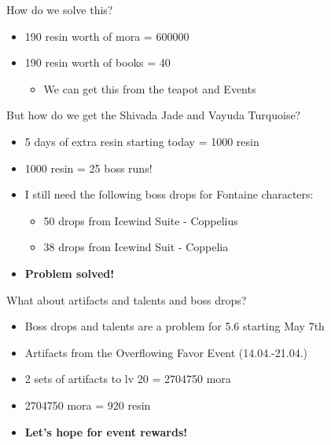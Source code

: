\documentclass{beamer}
\begin{document}
\begin{frame}{How do we solve this?}
\begin{itemize}
    \pause 
    \item 190 resin worth of mora = 600000
    \pause 
    \item 190 resin worth of books = 40 
    \pause 
        \begin{itemize}
            \item We can get this from the teapot and Events 
        \end{itemize}
\end{itemize}
\pause 

\end{frame}

\begin{frame}{But how do we get the Shivada Jade and Vayuda Turquoise?}
\begin{itemize}
    \item 5 days of extra resin starting today = 1000 resin 
    \item 1000 resin = 25 boss runs!
    \item I still need the following boss drops for Fontaine characters: 
        \begin{itemize}
            \item 50 drops from Icewind Suite - Coppelius
            \item 38 drops from Icewind Suit - Coppelia
        \end{itemize}
    \item\textbf{Problem solved!}
\end{itemize}
\pause 

\end{frame}

\begin{frame}{What about artifacts and talents and boss drops?}
\begin{itemize}
    \pause
    \item Boss drops and talents are a problem for 5.6 starting May 7th 
    \pause
    \item Artifacts from the Overflowing Favor Event (14.04.-21.04.)
    \pause
    \item 2 sets of artifacts to lv 20 = 2704750 mora 
    \pause
    \item 2704750 mora = 920 resin 
    \pause
    \item \textbf{Let's hope for event rewards!}
\end{itemize}
\pause 

\end{frame}
\end{document}
